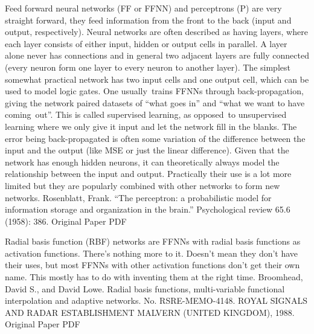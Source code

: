 \documentclass[11pt,a4paper,oneside]{ctexbook}
\begin{document}
Feed forward neural networks (FF or FFNN) and perceptrons (P) are very straight forward, they feed information from the front to the back (input and output, respectively). Neural networks are often described as having layers, where each layer consists of either input, hidden or output cells in parallel. A layer alone never has connections and in general two adjacent layers are fully connected (every neuron form one layer to every neuron to another layer). The simplest somewhat practical network has two input cells and one output cell, which can be used to model logic gates. One usually trains FFNNs through back-propagation, giving the network paired datasets of “what goes in” and “what we want to have coming out”. This is called supervised learning, as opposed to unsupervised learning where we only give it input and let the network fill in the blanks. The error being back-propagated is often some variation of the difference between the input and the output (like MSE or just the linear difference). Given that the network has enough hidden neurons, it can theoretically always model the relationship between the input and output. Practically their use is a lot more limited but they are popularly combined with other networks to form new networks.
Rosenblatt, Frank. “The perceptron: a probabilistic model for information storage and organization in the brain.” Psychological review 65.6 (1958): 386.
Original Paper PDF


Radial basis function (RBF) networks are FFNNs with radial basis functions as activation functions. There’s nothing more to it. Doesn’t mean they don’t have their uses, but most FFNNs with other activation functions don’t get their own name. This mostly has to do with inventing them at the right time.
Broomhead, David S., and David Lowe. Radial basis functions, multi-variable functional interpolation and adaptive networks. No. RSRE-MEMO-4148. ROYAL SIGNALS AND RADAR ESTABLISHMENT MALVERN (UNITED KINGDOM), 1988.
Original Paper PDF
\end{document}
